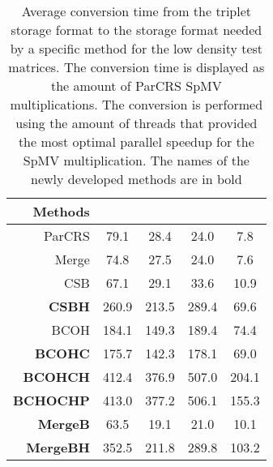 \begin{table}
    \centering
    \small
    \caption{Average conversion time from the triplet storage format to the storage format needed by a specific method for the low density test matrices. The conversion time is displayed as the amount of ParCRS SpMV multiplications. The conversion is performed using the amount of threads that provided the most optimal parallel speedup for the SpMV multiplication. The names of the newly developed methods are in bold}\label{tab:ConversionL}
    \begin{tabular}{r S[table-format=3.1] S[table-format=3.1] S[table-format=3.1] S[table-format=3.1]}
        Methods &  &  &  & \\
        \midrule
        ParCRS           & 79.1  & 28.4  & 24.0  &  7.8  \\
        Merge            & 74.8  & 27.5  & 24.0  &  7.6  \\
        CSB              & 67.1  & 29.1  & 33.6  & 10.9  \\
        \textbf{CSBH}    & 260.9 & 213.5 & 289.4 & 69.6  \\
        BCOH             & 184.1 & 149.3 & 189.4 & 74.4  \\
        \textbf{BCOHC}   & 175.7 & 142.3 & 178.1 & 69.0  \\
        \textbf{BCOHCH}  & 412.4 & 376.9 & 507.0 & 204.1 \\
        \textbf{BCHOCHP} & 413.0 & 377.2 & 506.1 & 155.3 \\
        \textbf{MergeB}  & 63.5  & 19.1  & 21.0  & 10.1  \\
        \textbf{MergeBH} & 352.5 & 211.8 & 289.8 & 103.2 \\
    \end{tabular}
\end{table}